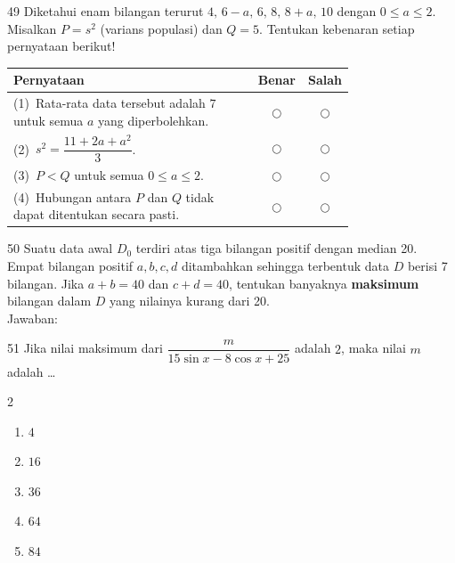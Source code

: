 \documentclass[11pt]{article}
\newenvironment{pilB}{%
  \par\smallskip\begin{multicols}{2}
  \begin{enumerate}[label=(\Alph*),leftmargin=*,itemsep=1pt,topsep=3pt]}%
  {\end{enumerate}\end{multicols}}
\begin{document}
\begin{soal}{49}
Diketahui enam bilangan terurut $4,\,6-a,\,6,\,8,\,8+a,\,10$ dengan
$0\leq a\leq2$. Misalkan $P=s^2$ (varians populasi) dan $Q=5$.
Tentukan kebenaran setiap pernyataan berikut!

\par\smallskip
{\renewcommand{\arraystretch}{1.4}%
\begin{tabular}{@{}p{0.76\linewidth}cc@{}}
\hline
\textbf{Pernyataan} & \textbf{Benar} & \textbf{Salah}\\
\hline
(1)~Rata-rata data tersebut adalah $7$ untuk semua $a$ yang
    diperbolehkan.
  & $\bigcirc$ & $\bigcirc$\\
(2)~$s^2 = \dfrac{11+2a+a^2}{3}$.
  & $\bigcirc$ & $\bigcirc$\\
(3)~$P < Q$ untuk semua $0\leq a\leq2$.
  & $\bigcirc$ & $\bigcirc$\\
(4)~Hubungan antara $P$ dan $Q$ tidak dapat ditentukan secara pasti.
  & $\bigcirc$ & $\bigcirc$\\
\hline
\end{tabular}}
\end{soal}

\begin{soal}{50}
Suatu data awal $D_0$ terdiri atas tiga bilangan positif dengan median
20. Empat bilangan positif $a,b,c,d$ ditambahkan sehingga terbentuk
data $D$ berisi 7 bilangan. Jika $a+b=40$ dan $c+d=40$, tentukan
banyaknya \textbf{maksimum} bilangan dalam $D$ yang nilainya kurang
dari 20.\\[0.4em]
Jawaban:\enspace\underline{\hspace{4cm}}
\end{soal}


\begin{soal}{51}
Jika nilai maksimum dari $\dfrac{m}{15\sin x-8\cos x+25}$ adalah $2$,
maka nilai $m$ adalah \ldots
\begin{pilB}
  \item $4$ \item $16$ \item $36$ \item $64$ \item $84$
\end{pilB}
\end{soal}
\end{document}
